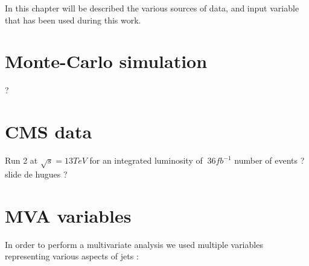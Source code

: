 \label{sec:unchapitre}

In this chapter will be described the various sources of data, and input variable that has been used during this work.

\section{Monte-Carlo simulation}

?

\section{CMS data}

Run 2 at $\sqrt{s} = 13 TeV$ for an integrated luminosity of $~ 36 fb^{-1}$
number of events ? slide de hugues ?

\section{MVA variables}

In order to perform a multivariate analysis we used multiple variables representing various aspects of jets :

